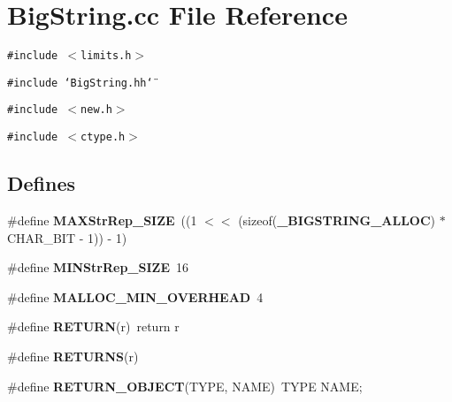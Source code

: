 \section{Big\-String.cc File Reference}
\label{BigString_8cc}
{\tt \#include $<$limits.h$>$}\par
{\tt \#include \char`\"{}Big\-String.hh\char`\"{}}\par
{\tt \#include $<$new.h$>$}\par
{\tt \#include $<$ctype.h$>$}\par
\subsection*{Defines}
\begin{CompactItemize}
\item 
\#define {\bf MAXStr\-Rep\_\-SIZE}\ ((1 $<$$<$ (sizeof({\bf \_\-BIGSTRING\_\-ALLOC}) $\ast$ CHAR\_\-BIT - 1)) - 1)
\item 
\#define {\bf MINStr\-Rep\_\-SIZE}\ 16
\item 
\#define {\bf MALLOC\_\-MIN\_\-OVERHEAD}\ 4
\item 
\#define {\bf RETURN}(r)\ return r
\item 
\#define {\bf RETURNS}(r)
\item 
\#define {\bf RETURN\_\-OBJECT}(TYPE, NAME)\ TYPE NAME;
\end{CompactItemize}
